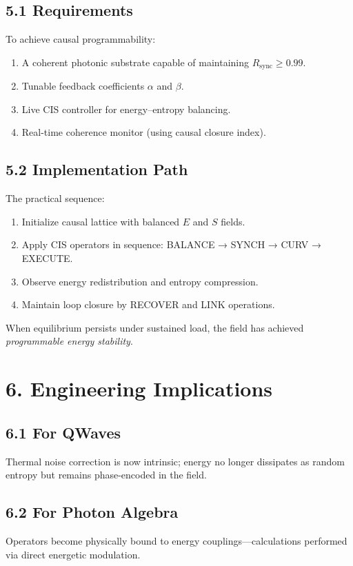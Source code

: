 \documentclass[11pt,a4paper]{article}
\begin{document}
\subsection*{5.1 Requirements}
To achieve causal programmability:
\begin{enumerate}
  \item A coherent photonic substrate capable of maintaining $R_{\text{sync}} \ge 0.99$.
  \item Tunable feedback coefficients $\alpha$ and $\beta$.
  \item Live CIS controller for energy–entropy balancing.
  \item Real-time coherence monitor (using causal closure index).
\end{enumerate}

\subsection*{5.2 Implementation Path}
The practical sequence:
\begin{enumerate}
  \item Initialize causal lattice with balanced $E$ and $S$ fields.
  \item Apply CIS operators in sequence: BALANCE → SYNCH → CURV → EXECUTE.
  \item Observe energy redistribution and entropy compression.
  \item Maintain loop closure by RECOVER and LINK operations.
\end{enumerate}
When equilibrium persists under sustained load, the field has achieved \textit{programmable energy stability}.

\section{6. Engineering Implications}
\subsection*{6.1 For QWaves}
Thermal noise correction is now intrinsic; energy no longer dissipates as random entropy but remains phase-encoded in the field.

\subsection*{6.2 For Photon Algebra}
Operators become physically bound to energy couplings—calculations performed via direct energetic modulation.
\end{document}
